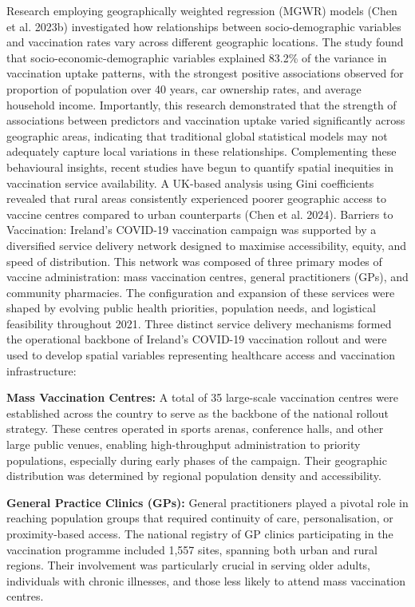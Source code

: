 \documentclass{article}
\begin{document}
Research employing geographically weighted regression (MGWR) models
(Chen et al. 2023b) investigated how relationships between
socio-demographic variables and vaccination rates vary across different
geographic locations. The study found that socio-economic-demographic
variables explained 83.2\% of the variance in vaccination uptake
patterns, with the strongest positive associations observed for
proportion of population over 40 years, car ownership rates, and average
household income. Importantly, this research demonstrated that the
strength of associations between predictors and vaccination uptake
varied significantly across geographic areas, indicating that
traditional global statistical models may not adequately capture local
variations in these relationships. Complementing these behavioural
insights, recent studies have begun to quantify spatial inequities in
vaccination service availability. A UK-based analysis using Gini
coefficients revealed that rural areas consistently experienced poorer
geographic access to vaccine centres compared to urban counterparts
(Chen et al. 2024). Barriers to Vaccination: Ireland's COVID-19
vaccination campaign was supported by a diversified service delivery
network designed to maximise accessibility, equity, and speed of
distribution. This network was composed of three primary modes of
vaccine administration: mass vaccination centres, general practitioners
(GPs), and community pharmacies. The configuration and expansion of
these services were shaped by evolving public health priorities,
population needs, and logistical feasibility throughout 2021. Three
distinct service delivery mechanisms formed the operational backbone of
Ireland's COVID-19 vaccination rollout and were used to develop spatial
variables representing healthcare access and vaccination infrastructure:

\textbf{Mass Vaccination Centres:} A total of 35 large-scale vaccination
centres were established across the country to serve as the backbone of
the national rollout strategy. These centres operated in sports arenas,
conference halls, and other large public venues, enabling
high-throughput administration to priority populations, especially
during early phases of the campaign. Their geographic distribution was
determined by regional population density and accessibility.

\textbf{General Practice Clinics (GPs):} General practitioners played a
pivotal role in reaching population groups that required continuity of
care, personalisation, or proximity-based access. The national registry
of GP clinics participating in the vaccination programme included 1,557
sites, spanning both urban and rural regions. Their involvement was
particularly crucial in serving older adults, individuals with chronic
illnesses, and those less likely to attend mass vaccination centres.
\end{document}
